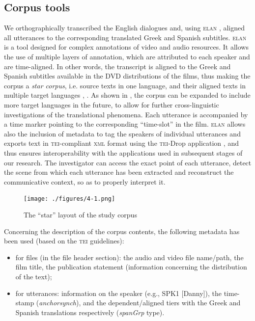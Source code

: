 \documentclass[output=paper]{LSP/langsci}
\begin{document}
\subsection{Corpus tools} \label{sec:2:3:2}

We orthographically transcribed the English dialogues and, using \textsc{elan} \citep{Brugman2004}, aligned all utterances to the corresponding translated Greek and Spanish subtitles. \textsc{elan} is a tool designed for complex annotations of video and audio resources. It allows the use of multiple layers of annotation, which are attributed to each speaker and are time-aligned. In other words, the transcript is aligned to the Greek and Spanish subtitles available in the DVD distributions of the films, thus making the corpus a \textit{star corpus}, i.e. source texts in one language, and their aligned texts in multiple target languages \citep[see][140--141]{Johansson2003}, \citep[see][260]{Saridakis2010}. As shown in , the corpus can be expanded to include more target languages in the future, to allow for further cross-linguistic investigations of the translational phenomena. Each utterance is accompanied by a time marker pointing to the corresponding “time-slot” in the film. \textsc{elan} allows also the inclusion of metadata to tag the speakers of individual utterances and exports text in \textsc{tei}-compliant \textsc{xml} format using the \textsc{tei}-Drop application \citep{Schmidt2011}, and thus ensures interoperability with the applications used in subsequent stages of our research. The investigator can access the exact point of each utterance, detect the scene from which each utterance has been extracted and reconstruct the communicative context, so as to properly interpret it.

\begin{figure}
\texttt{[image: ./figures/4-1.png]}
\caption{The “star” layout of the study corpus} \label{fig:2:1}
\end{figure}

Concerning the description of the corpus contents, the following metadata has been used (based on the \textsc{tei} guidelines):

\begin{itemize}
\item for files (in the file header section): the audio and video file name/path, the film title, the publication statement (information concerning the distribution of the text);
\item for utterances: information on the speaker (e.g., SPK1 [Danny]), the time-stamp (\textit{anchorsynch}), and the dependent/aligned tiers with the Greek and Spanish translations respectively (\textit{spanGrp} type).
\end{itemize}
\end{document}
